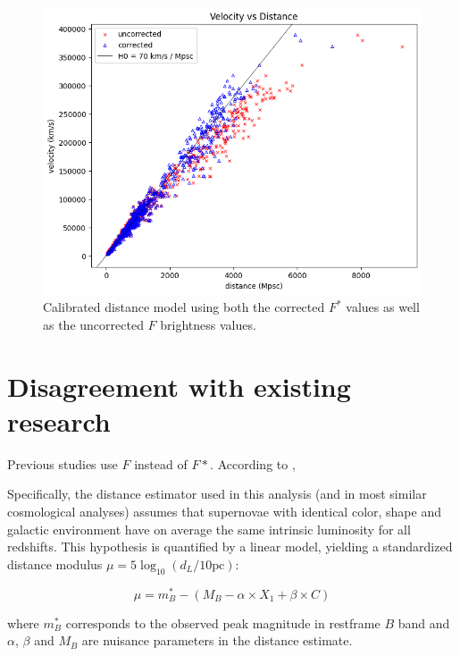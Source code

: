 \documentclass{article}
\begin{document}
\begin{figure}[h!]
  \includegraphics[width=\linewidth]{../graphs/both_calibrated_velocity_vs_distance.png}
  \caption{Calibrated distance model using both the corrected $F^*$ values as
  well as the uncorrected $F$ brightness values.}
  \label{fig:calibrated}
\end{figure}

\section{Disagreement with existing research}

Previous studies use $F$ instead of $F*$. According to \citet{betoule2014},

\begin{displayquote}
  Specifically, the distance estimator used in this analysis (and in most
  similar cosmological analyses) assumes that supernovae with identical color,
  shape and galactic environment have on average the same intrinsic luminosity
  for all redshifts. This hypothesis is quantified by a linear model, yielding
  a standardized distance modulus $\mu = 5 \log_{10}{(d_L / 10 \text{pc})}$:

  \begin{equation}
  \label{eq:betoule_distance_modulus}
    \mu = m_B^* - (M_B - \alpha \times X_1 + \beta \times C)
  \end{equation}

  where $m_B^*$ corresponds to the observed peak magnitude in restframe $B$
  band and $\alpha$, $\beta$ and $M_B$ are nuisance parameters in the distance
  estimate.
\end{displayquote}
\end{document}
